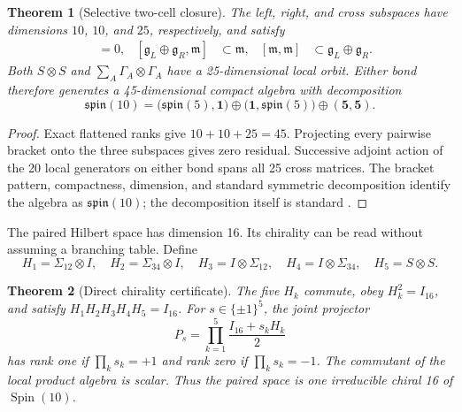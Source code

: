 \documentclass[11pt]{article}
\newtheorem{theorem}{Theorem}[section]
\theoremstyle{remark}\newtheorem{remark}[theorem]{Remark}
\begin{document}
\begin{theorem}[Selective two-cell closure]\label{w:thm:spin10}
The left, right, and cross subspaces have dimensions $10$, $10$, and $25$, respectively, and satisfy
\begin{align}
[\mathfrak g_L,\mathfrak g_R]&=0,&
[\mathfrak g_L\oplus\mathfrak g_R,\mathfrak m]&\subset\mathfrak m,&
[\mathfrak m,\mathfrak m]&\subset\mathfrak g_L\oplus\mathfrak g_R.
\end{align}
Both $S\otimes S$ and $\sum_A\Gamma_A\otimes\Gamma_A$ have a 25-dimensional local orbit.  Either bond therefore generates a 45-dimensional compact algebra with decomposition
\begin{equation}
\mathfrak{spin}(10)
=\bigl(\mathfrak{spin}(5),\mathbf1\bigr)
\oplus\bigl(\mathbf1,\mathfrak{spin}(5)\bigr)
\oplus(\mathbf5,\mathbf5).
\label{w:eq:spin10decomp}
\end{equation}
\end{theorem}

\begin{proof}
Exact flattened ranks give $10+10+25=45$.  Projecting every pairwise bracket onto the three subspaces gives zero residual.  Successive adjoint action of the 20 local generators on either bond spans all 25 cross matrices.  The bracket pattern, compactness, dimension, and standard symmetric decomposition identify the algebra as $\mathfrak{spin}(10)$; the decomposition itself is standard \cite{Slansky1981}.
\end{proof}

The paired Hilbert space has dimension 16.  Its chirality can be read without assuming a branching table.  Define
\begin{equation}
H_1=\Sigma_{12}\otimes I,\quad H_2=\Sigma_{34}\otimes I,\quad
H_3=I\otimes\Sigma_{12},\quad H_4=I\otimes\Sigma_{34},\quad
H_5=S\otimes S.
\end{equation}

\begin{theorem}[Direct chirality certificate]\label{w:thm:chirality}
The five $H_k$ commute, obey $H_k^2=I_{16}$, and satisfy
$H_1H_2H_3H_4H_5=I_{16}$.  For $s\in\{\pm1\}^5$, the joint projector
\begin{equation}
P_s=\prod_{k=1}^5\frac{I_{16}+s_kH_k}{2}
\end{equation}
has rank one if $\prod_ks_k=+1$ and rank zero if $\prod_ks_k=-1$.  The commutant of the local product algebra is scalar.  Thus the paired space is one irreducible chiral 16 of $\operatorname{Spin}(10)$.
\end{theorem}
\end{document}

